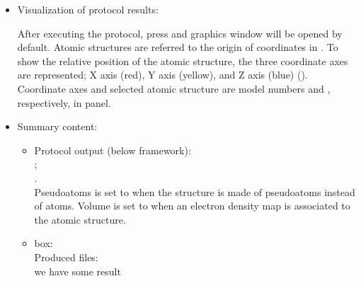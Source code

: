 \begin{itemize}
  

  \item Visualization of protocol results:
  
  After executing the protocol, press  and \chimera graphics window will be opened by default. 
  Atomic structures are referred to the origin of coordinates in \chimera . To show the relative position of the atomic structure, the three coordinate axes are represented; X axis (red), Y axis (yellow), and Z axis (blue) (). Coordinate axes and selected atomic structure  are model numbers  and , respectively, in \chimera {} panel.
   
   \item Summary content:
    \begin{itemize}
     \item Protocol output (below \scipion framework):\\ ;\\
     .\\Pseudoatoms is set to  when the structure is made of pseudoatoms instead of atoms. Volume is set to  when an electron density map is associated to the atomic structure.
     \item {} box:\\Produced files:\\we have some result
    \end{itemize}
  
  \end{itemize}

  

